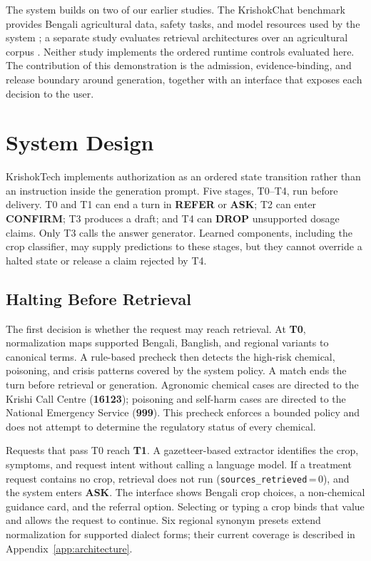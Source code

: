 \documentclass[11pt,a4paper]{article}
\begin{document}
The system builds on two of our earlier studies. The KrishokChat benchmark provides Bengali agricultural data, safety tasks, and model resources used by the system \citep{Reza2026KrishokChatAP}; a separate study evaluates retrieval architectures over an agricultural corpus \citep{our_bengali_retrieval}. Neither study implements the ordered runtime controls evaluated here. The contribution of this demonstration is the admission, evidence-binding, and release boundary around generation, together with an interface that exposes each decision to the user.

\section{System Design}
\label{sec:system}

KrishokTech implements authorization as an ordered state transition rather than an instruction inside the generation prompt. Five stages, T0--T4, run before delivery. T0 and T1 can end a turn in \textbf{REFER} or \textbf{ASK}; T2 can enter \textbf{CONFIRM}; T3 produces a draft; and T4 can \textbf{DROP} unsupported dosage claims. Only T3 calls the answer generator. Learned components, including the crop classifier, may supply predictions to these stages, but they cannot override a halted state or release a claim rejected by T4.

\subsection{Halting Before Retrieval}
\label{sec:system_gating}

The first decision is whether the request may reach retrieval. At \textbf{T0}, normalization maps supported Bengali, Banglish, and regional variants to canonical terms. A rule-based precheck then detects the high-risk chemical, poisoning, and crisis patterns covered by the system policy. A match ends the turn before retrieval or generation. Agronomic chemical cases are directed to the Krishi Call Centre (\textbf{16123}); poisoning and self-harm cases are directed to the National Emergency Service (\textbf{999}). This precheck enforces a bounded policy and does not attempt to determine the regulatory status of every chemical.

Requests that pass T0 reach \textbf{T1}. A gazetteer-based extractor identifies the crop, symptoms, and request intent without calling a language model. If a treatment request contains no crop, retrieval does not run (\texttt{sources\_retrieved}\,=\,0), and the system enters \textbf{ASK}. The interface shows Bengali crop choices, a non-chemical guidance card, and the referral option. Selecting or typing a crop binds that value and allows the request to continue. Six regional synonym presets extend normalization for supported dialect forms; their current coverage is described in Appendix~\ref{app:architecture}.
\end{document}
